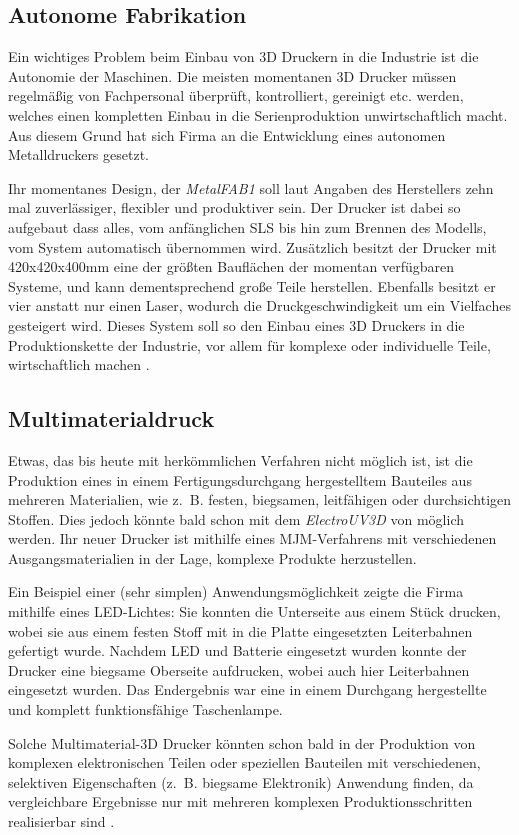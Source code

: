 \subsection{Autonome Fabrikation}
Ein wichtiges Problem beim Einbau von 3D Druckern in die Industrie ist die Autonomie der Maschinen. Die meisten momentanen 3D Drucker müssen regelmäßig von Fachpersonal überprüft, kontrolliert, gereinigt etc. werden, welches einen kompletten Einbau in die Serienproduktion unwirtschaftlich macht. Aus diesem Grund hat sich Firma  an die Entwicklung eines autonomen Metalldruckers gesetzt. 

Ihr momentanes Design, der \emph{MetalFAB1} soll laut Angaben des Herstellers zehn mal zuverlässiger, flexibler und produktiver sein. Der Drucker ist dabei so aufgebaut dass alles, vom anfänglichen SLS bis hin zum Brennen des Modells, vom System automatisch übernommen wird. Zusätzlich besitzt der Drucker mit 420x420x400mm eine der größten Bauflächen der momentan verfügbaren Systeme, und kann dementsprechend große Teile herstellen. Ebenfalls besitzt er vier anstatt nur einen Laser, wodurch die Druckgeschwindigkeit um ein Vielfaches gesteigert wird.
Dieses System soll so den Einbau eines 3D Druckers in die Produktionskette der Industrie, vor allem für komplexe oder individuelle Teile, wirtschaftlich machen \parencite{MetalFAB}.

\subsection{Multimaterialdruck}
Etwas, das bis heute mit herkömmlichen Verfahren nicht möglich ist, ist die Produktion eines in einem Fertigungsdurchgang hergestelltem Bauteiles aus mehreren Materialien, wie z.~B. festen, biegsamen, leitfähigen oder durchsichtigen Stoffen. Dies jedoch könnte bald schon mit dem \emph{ElectroUV3D} von  möglich werden. Ihr neuer Drucker ist mithilfe eines MJM-Verfahrens mit verschiedenen Ausgangsmaterialien in der Lage, komplexe Produkte herzustellen. 

Ein Beispiel einer (sehr simplen) Anwendungsmöglichkeit zeigte die Firma mithilfe eines LED-Lichtes: Sie konnten die Unterseite aus einem Stück drucken, wobei sie aus einem festen Stoff mit in die Platte eingesetzten Leiterbahnen gefertigt wurde. Nachdem LED und Batterie eingesetzt wurden konnte der Drucker eine biegsame Oberseite aufdrucken, wobei auch hier Leiterbahnen eingesetzt wurden. Das Endergebnis war eine in einem Durchgang hergestellte und komplett funktionsfähige Taschenlampe.

Solche Multimaterial-3D Drucker könnten schon bald in der Produktion von komplexen elektronischen Teilen oder speziellen Bauteilen mit verschiedenen, selektiven Eigenschaften (z.~B. biegsame Elektronik) Anwendung finden, da vergleichbare Ergebnisse nur mit mehreren komplexen Produktionsschritten realisierbar sind \parencite{Multimaterial}.